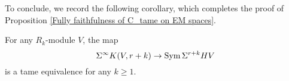 To conclude, we record the following corollary, which completes the proof of Proposition \ref{Fully faithfulness of C_tame on EM spaces}.
\begin{corollary}
\label{Suspension of Eilenberg-Maclane spaces are symmetric algebra}
	For any $R_k$-module $V$, the map 
	$$\Sigma^{\infty}K(V,r+k) \to 
	\operatorname{Sym} \Sigma^{r+k}HV$$ is a tame equivalence for any $k\geq 1$.
\end{corollary}







%
%










